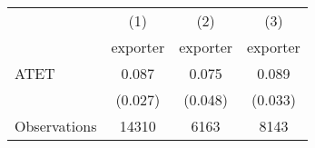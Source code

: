 \begin{tabular}{l*{3}{c}}
\hline\hline
                    &\multicolumn{1}{c}{(1)}&\multicolumn{1}{c}{(2)}&\multicolumn{1}{c}{(3)}\\
                    &\multicolumn{1}{c}{exporter}&\multicolumn{1}{c}{exporter}&\multicolumn{1}{c}{exporter}\\
\hline
ATET                &       0.087&       0.075&       0.089\\
                    &     (0.027)&     (0.048)&     (0.033)\\
\hline
Observations        &       14310&        6163&        8143\\
\hline\hline
\end{tabular}
